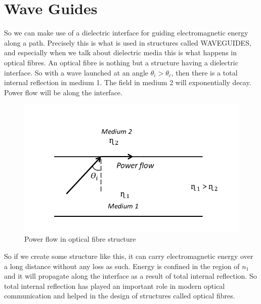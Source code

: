 \section{Wave Guides}

So we can make use of a dielectric interface for guiding electromagnetic energy along a path. Precisely this is what is used in structures called WAVEGUIDES, and especially when we talk about dielectric media this is what happens in optical fibres. An optical fibre is nothing but a structure having a dielectric interface. So with a wave launched at an angle $\theta_i > \theta_c$,
then there is a total internal reflection in medium 1. The field in medium 2 will exponentially decay. Power flow will be along the interface.

\begin{figure}[h]
\centering
\includegraphics[width=1\linewidth]{graphics/optical_fibre}
\caption{Power flow in optical fibre structure}
\end{figure}

So if we create some structure like this, it can carry electromagnetic energy over a long distance without any loss as such. Energy is confined in the region of $n_1$ and it will propagate along the interface as a result of total internal reflection. So total internal reflection has played an important role in modern optical communication and helped in the design of structures called optical fibres. 


